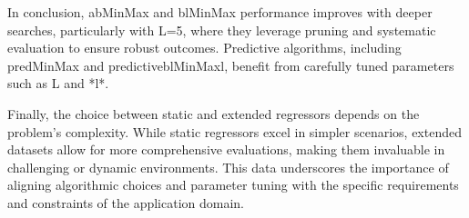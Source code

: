 \documentclass[10pt, letterpaper]{article}
\begin{document}
In conclusion, abMinMax and blMinMax performance improves with deeper searches, particularly with L=5, where they leverage pruning and systematic evaluation to ensure robust outcomes. Predictive algorithms, including predMinMax and predictiveblMinMaxl, benefit from carefully tuned parameters such as L and *l*.

Finally, the choice between static and extended regressors depends on the problem's complexity. While static regressors excel in simpler scenarios, extended datasets allow for more comprehensive evaluations, making them invaluable in challenging or dynamic environments. This data underscores the importance of aligning algorithmic choices and parameter tuning with the specific requirements and constraints of the application domain.
\end{document}
